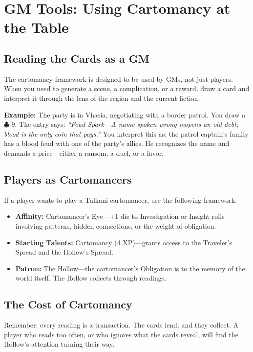 \documentclass[11pt,letterpaper,twoside]{book}
\begin{document}
\section*{GM Tools: Using Cartomancy at the Table}

\subsection*{Reading the Cards as a GM}

The cartomancy framework is designed to be used by GMs, not just players. When you need to generate a scene, a complication, or a reward, draw a card and interpret it through the lens of the region and the current fiction.

\textbf{Example:} The party is in Vhasia, negotiating with a border patrol. You draw a $\clubsuit$ 9. The entry says: \textit{``Feud Spark---A name spoken wrong reopens an old debt; blood is the only coin that pays.''} You interpret this as: the patrol captain's family has a blood feud with one of the party's allies. He recognizes the name and demands a price---either a ransom, a duel, or a favor.

\subsection*{Players as Cartomancers}

If a player wants to play a Tulkani cartomancer, use the following framework:

\begin{itemize}
    \item \textbf{Affinity:} Cartomancer's Eye---+1 die to Investigation or Insight rolls involving patterns, hidden connections, or the weight of obligation.
    \item \textbf{Starting Talents:} Cartomancy (4 XP)---grants access to the Traveler's Spread and the Hollow's Spread.
    \item \textbf{Patron:} The Hollow---the cartomancer's Obligation is to the memory of the world itself. The Hollow collects through readings.
\end{itemize}

\subsection*{The Cost of Cartomancy}

Remember: every reading is a transaction. The cards lend, and they collect. A player who reads too often, or who ignores what the cards reveal, will find the Hollow's attention turning their way.
\end{document}
